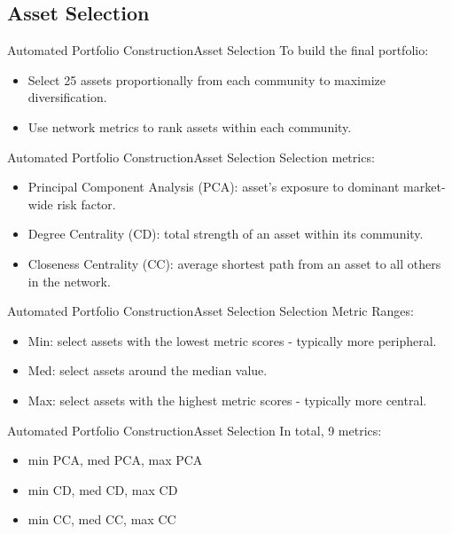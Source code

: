 \documentclass[bigger]{beamer}
\begin{document}
\subsection{Asset Selection}

\begin{frame}{Automated Portfolio Construction}{Asset Selection}
    To build the final portfolio:
    \begin{itemize}
        \item<2-> Select 25 assets proportionally from each community to maximize diversification.
        \item<3-> Use network metrics to rank assets within each community.
    \end{itemize}
\end{frame}

\begin{frame}{Automated Portfolio Construction}{Asset Selection}
    Selection metrics:
    \begin{itemize}
        \item<2-> Principal Component Analysis (PCA): asset’s exposure to dominant market-wide risk factor.
        \item<3-> Degree Centrality (CD): total strength of an asset within its community.
        \item<4-> Closeness Centrality (CC): average shortest path from an asset to all others in the network.
    \end{itemize}
\end{frame}

\begin{frame}{Automated Portfolio Construction}{Asset Selection}
    Selection Metric Ranges:
    \begin{itemize}
        \item<2-> Min: select assets with the lowest metric scores - typically more peripheral.
        \item<3-> Med: select assets around the median value.
        \item<4-> Max: select assets with the highest metric scores - typically more central.
    \end{itemize}
\end{frame}

\begin{frame}{Automated Portfolio Construction}{Asset Selection}
    In total, 9 metrics:
    \begin{itemize}
        \item<2-> min PCA, med PCA, max PCA
        \item<3-> min CD, med CD, max CD
        \item<4-> min CC, med CC, max CC
    \end{itemize}
\end{frame}
\end{document}
